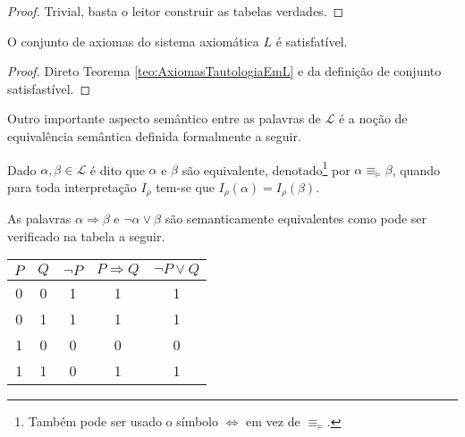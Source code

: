 \begin{proof}
  Trivial, basta o leitor construir as tabelas verdades.
\end{proof}

\begin{corolario}\label{col:AxiomasTautologiaEmL}
  O conjunto de axiomas do sistema axiomática $L$ é satisfatível.
\end{corolario}

\begin{proof}
  Direto Teorema \ref{teo:AxiomasTautologiaEmL} e da definição de conjunto satisfastível.
\end{proof}

Outro importante aspecto semântico entre as palavras de $\mathcal{L}$ é a noção de equivalência semântica definida formalmente a seguir.

\begin{definicao}\label{def:EquivalenciaSemantica}
  Dado $\alpha, \beta \in \mathcal{L}$ é dito que $\alpha$ e $\beta$ são equivalente, denotado\footnote{Também pode ser usado o símbolo $\Leftrightarrow$ em vez de $\equiv_\vDash$.} por $\alpha \equiv_\vDash \beta$, quando para toda interpretação $I_\rho$ tem-se que $I_\rho(\alpha) = I_\rho(\beta)$.
\end{definicao}

\begin{exemplo}
  As palavras $\alpha \Rightarrow \beta$ e $\neg \alpha \lor \beta$ são semanticamente equivalentes como pode ser verificado na tabela a seguir.

  \begin{table}[H]
    \centering
    \begin{tabular}{|c|c|c|c|c|}
        \hline
        $P$ & $Q$ & $\neg P$ & $P \Rightarrow Q$ & $\neg P \lor Q$\\
        \hline
        0 & 0 & 1 & 1 & 1\\ \hline
        0 & 1 & 1 & 1 & 1\\ \hline
        1 & 0 & 0 & 0 & 0\\ \hline
        1 & 1 & 0 & 1 & 1\\ \hline
    \end{tabular}
  \end{table}
\end{exemplo}

